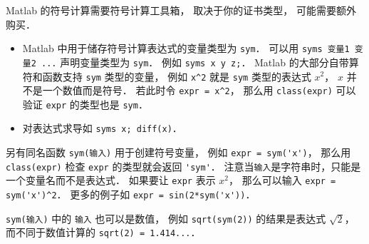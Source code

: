 
Matlab 的符号计算需要符号计算工具箱， 取决于你的证书类型， 可能需要额外购买． 

\begin{itemize}
\item Matlab 中用于储存符号计算表达式的变量类型为 \verb|sym|． 可以用 \verb|syms 变量1 变量2 ...| 声明变量类型为 \verb|sym|． 例如 \verb|syms x y z;|． Matlab 的大部分自带算符和函数支持 \verb|sym| 类型的变量， 例如 \verb|x^2| 就是 \verb|sym| 类型的表达式 $x^2$， $x$ 并不是一个数值而是符号． 若此时令 \verb|expr = x^2|， 那么用 \verb|class(expr)| 可以验证 \verb|expr| 的类型也是 \verb|sym|．
\item  对表达式求导如 \verb|syms x; diff(x)|．
\end{itemize}

  另有同名函数 \verb|sym(输入)| 用于创建符号变量， 例如 \verb|expr = sym('x')|， 那么用 \verb|class(expr)| 检查 \verb|expr| 的类型就会返回 \verb|'sym'|． 注意当\verb|输入|是字符串时，只能是一个变量名而不是表达式． 如果要让 \verb|expr| 表示 $x^2$， 那么可以输入 \verb|expr = sym('x')^2|． 更多的例子如 \verb|expr = sin(2*sym('x'))|．

\verb|sym(输入)| 中的 \verb|输入| 也可以是数值， 例如 \verb|sqrt(sym(2))| 的结果是表达式 $\sqrt 2$， 而不同于数值计算的 \verb|sqrt(2) = 1.414...|．


